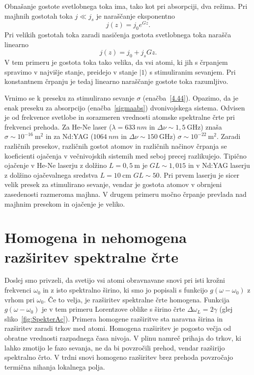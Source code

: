 Obnašanje gostote svetlobnega toka ima, tako kot pri absorpciji, dva režima. 
Pri majhnih gostotah toka $j\ll j_{s}$ je naraščanje eksponentno 
\begin{equation}
j(z)=j_{0}e^{Gz}.
\label{4.45}
\end{equation}
Pri velikih gostotah toka zaradi nasičenja gostota svetlobnega
toka narašča linearno
\begin{equation}
j(z)=j_{0}+j_{s}Gz.
\label{4.46}
\end{equation}
V tem primeru je gostota toka tako velika, da vsi atomi, ki jih
s črpanjem spravimo v najvišje stanje, preidejo v stanje $|1\rangle$
s stimuliranim sevanjem. Pri konstantnem črpanju je tedaj 
linearno naraščanje gostote toka razumljivo. 

Vrnimo se k preseku za stimulirano sevanje $\sigma$
 (enačba~\ref{4.44}). Opazimo, da je enak preseku za
absorpcijo (enačba~\ref{sigmaabs}) dvonivojskega sistema.
Odvisen je od frekvence svetlobe in sorazmeren vrednosti atomske spektralne 
črte pri frekvenci prehoda. Za He-Ne laser 
($\lambda=633~\si{nm}$ in $\Delta \nu \sim 1,5~\si{\giga\hertz}$) znaša   
$\sigma \sim 10^{-16}~\si{\metre}^2$ in
za Nd:YAG ($1064~\si{nm}$ in $\Delta \nu \sim 150~\si{\giga\hertz}$)
$\sigma \sim 10^{-22}~\si{\metre}^2$.
Zaradi različnih presekov, različnih gostot atomov in različnih načinov črpanja se 
koeficienti ojačenja v večnivojskih sistemih med seboj precej razlikujejo. Tipično
ojačenje v He-Ne laserju z dolžino $L = 0,5~\si{\metre}$ je 
$GL \sim 1,015$ in v Nd:YAG laserju z dolžino ojačevalnega sredstva 
$L = 10~\si{\centi\metre}$ $GL \sim 50$. Pri prvem laserju je sicer 
velik presek za stimulirano sevanje, vendar je gostota atomov v obrnjeni zasedenosti 
razmeroma majhna. V drugem primeru močno črpanje prevlada nad majhnim presekom 
in ojačenje je veliko.

\section{Homogena in nehomogena razširitev spektralne črte}
\label{Razsiritev}
Doslej smo privzeli, da svetijo vsi atomi obravnavane snovi
pri isti krožni frekvenci $\omega_{0}$ in z isto spektralno širino, ki smo
jo popisali s funkcijo $g(\omega-\omega_0)$ z vrhom pri $\omega_0$. Če to velja, 
je razširitev spektralne črte homogena. 
Funkcija $g(\omega-\omega_0)$ je v tem primeru Lorentzove oblike 
s širino črte $\Delta \omega_L = 2\gamma$ (glej sliko~\ref{fig:SpekterAc}). 
Primera homogene razširitve sta naravna širina in razširitev zaradi trkov med atomi.
Homogena razširitev je pogosto večja od obratne vrednosti razpadnega časa nivoja. 
V plinu namreč prihaja do trkov, ki lahko zmotijo le fazo sevanja, ne da bi povzročili 
prehod, vendar razširijo spektralno črto. V trdni snovi homogeno razširitev 
brez prehoda povzročajo termična nihanja lokalnega polja. 

